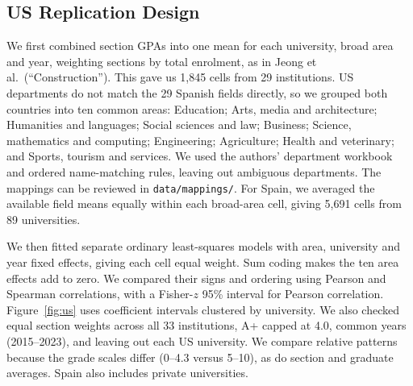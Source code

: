 \subsection{US Replication Design}
\label{sec:methods-us}

We first combined section GPAs into one mean for each university, broad area and year, weighting sections by total enrolment, as in Jeong et al.\ (``Construction''). This gave us 1,845 cells from 29 institutions. US departments do not match the 29 Spanish fields directly, so we grouped both countries into ten common areas: Education; Arts, media and architecture; Humanities and languages; Social sciences and law; Business; Science, mathematics and computing; Engineering; Agriculture; Health and veterinary; and Sports, tourism and services. We used the authors' department workbook and ordered name-matching rules, leaving out ambiguous departments. The mappings can be reviewed in \texttt{data/mappings/}. For Spain, we averaged the available field means equally within each broad-area cell, giving 5,691 cells from 89 universities.

We then fitted separate ordinary least-squares models with area, university and year fixed effects, giving each cell equal weight. Sum coding makes the ten area effects add to zero. We compared their signs and ordering using Pearson and Spearman correlations, with a Fisher-$z$ 95\% interval for Pearson correlation. Figure~\ref{fig:us} uses coefficient intervals clustered by university. We also checked equal section weights across all 33 institutions, A+ capped at 4.0, common years (2015--2023), and leaving out each US university. We compare relative patterns because the grade scales differ (0--4.3 versus 5--10), as do section and graduate averages. Spain also includes private universities.
